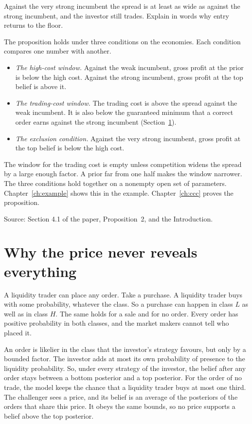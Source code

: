 \begin{checkyourself}
Against the very strong incumbent the spread is at least as wide as against the strong incumbent, and the investor still trades. Explain in words why entry returns to the floor.\label{q:story-turn}
\end{checkyourself}

The proposition holds under three conditions on the economies. Each condition compares one number with another.
\begin{itemize}
\item \emph{The high-cost window.} Against the weak incumbent, gross profit at the prior is below the high cost. Against the strong incumbent, gross profit at the top belief is above it.
\item \emph{The trading-cost window.} The trading cost is above the spread against the weak incumbent. It is also below the guaranteed minimum that a correct order earns against the strong incumbent (Section~\ref{sec:story-noise}).
\item \emph{The exclusion condition.} Against the very strong incumbent, gross profit at the top belief is below the high cost.
\end{itemize}
The window for the trading cost is empty unless competition widens the spread by a large enough factor. A prior far from one half makes the window narrower. The three conditions hold together on a nonempty open set of parameters. Chapter~\ref{ch:example} shows this in the example. Chapter~\ref{ch:ccc} proves the proposition.

{\small\color{notegrey}Source: Section 4.1 of the paper, Proposition~2, and the Introduction.}

\section{Why the price never reveals everything}\label{sec:story-noise}

A liquidity trader can place any order. Take a purchase. A liquidity trader buys with some probability, whatever the class. So a purchase can happen in class \(L\) as well as in class \(H\). The same holds for a sale and for no order. Every order has positive probability in both classes, and the market makers cannot tell who placed it.

An order is likelier in the class that the investor's strategy favours, but only by a bounded factor. The investor adds at most its own probability of presence to the liquidity probability. So, under every strategy of the investor, the belief after any order stays between a bottom posterior and a top posterior. For the order of no trade, the model keeps the chance that a liquidity trader buys at most one third. The challenger sees a price, and its belief is an average of the posteriors of the orders that share this price. It obeys the same bounds, so no price supports a belief above the top posterior.

